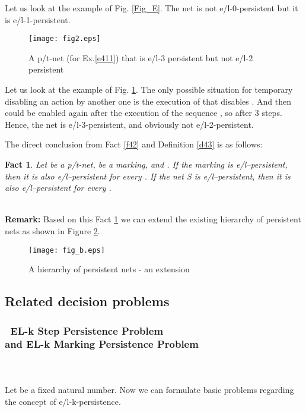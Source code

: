 \documentclass[a4paper]{llncs}
\newtheorem{fact}{Fact}
\begin{document}
\begin{example}
Let us look at the example of Fig. \ref{Fig_E}. The net is not e/l-0-persistent but it is e/l-1-persistent.
\end{example}
\begin{example}
\label{e411}

\begin{figure}[h]
\centering
\texttt{[image: fig2.eps]}
\caption{A p/t-net (for Ex.\ref{e411}) that is e/l-3 persistent but not e/l-2 persistent}
\label{Fig2}
\end{figure}

Let us look at the example of Fig. \ref{Fig2}. The only possible situation for temporary disabling an action by another one is the execution of  that disables . And then  could be enabled again after the execution of the sequence , so after 3 steps. Hence, the net is e/l-3-persistent, and obviously not e/l-2-persistent.
\end{example}
The direct conclusion from Fact \ref{f42} and Definition \ref{d43} is as follows:
\begin{fact}
\label{f44}
Let  be a p/t-net,  be a marking, and .
If the marking  is e/l--persistent, then it is also e/l--persistent for every .
If the net S is e/l--persistent, then it is also e/l--persistent for every .
\end{fact}
\mbox{ }\\
\textbf{Remark:} Based on this Fact \ref{f44} we can extend the existing hierarchy of persistent nets as shown in Figure \ref{FigB}.
\begin{figure}[h]
\centering
\texttt{[image: fig\_b.eps]}
\caption{A hierarchy of persistent nets - an extension}
\label{FigB}
\end{figure}

\subsection{Related decision problems}

\subsubsection{\textbullet\ EL-k Step Persistence Problem \\and EL-k Marking Persistence Problem}\mbox{ }\\ \\
Let  be a fixed natural number. Now we can formulate basic problems regarding the concept of e/l-k-persistence. \\ \\
\newpage
\end{document}
